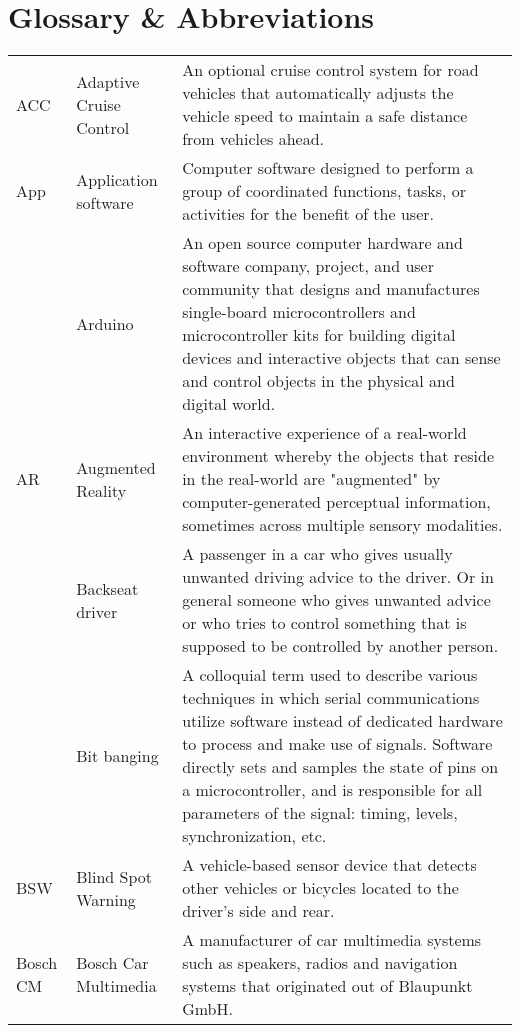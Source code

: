 \chapter*{Glossary \& Abbreviations}
\label{ch:glossary}

\newcolumntype{b}{X}

\begin{table}[ht!]
\renewcommand{\arraystretch}{1.5}
\begin{tabularx}{\textwidth}{smb}
ACC & Adaptive Cruise Control & An optional cruise control system for road vehicles that automatically adjusts the vehicle speed to maintain a safe distance from vehicles ahead. \\
App & Application software & Computer software designed to perform a group of coordinated functions, tasks, or activities for the benefit of the user. \\
 & Arduino & An open source computer hardware and software company, project, and user community that designs and manufactures single-board microcontrollers and microcontroller kits for building digital devices and interactive objects that can sense and control objects in the physical and digital world. \\
AR & Augmented Reality & An interactive experience of a real-world environment whereby the objects that reside in the real-world are "augmented" by computer-generated perceptual information, sometimes across multiple sensory modalities. \\
 & Backseat driver & A passenger in a car who gives usually unwanted driving advice to the driver. Or in general someone who gives unwanted advice or who tries to control something that is supposed to be controlled by another person. \\
 & Bit banging & A colloquial term used to describe various techniques in which serial communications utilize software instead of dedicated hardware to process and make use of signals. Software directly sets and samples the state of pins on a microcontroller, and is responsible for all parameters of the signal: timing, levels, synchronization, etc. \\
BSW & Blind Spot Warning & A vehicle-based sensor device that detects other vehicles or bicycles located to the driver’s side and rear. \\
Bosch CM & Bosch Car Multimedia & A manufacturer of car multimedia systems such as speakers, radios and navigation systems that originated out of Blaupunkt GmbH. \\

 
 \end{tabularx}
\end{table}

